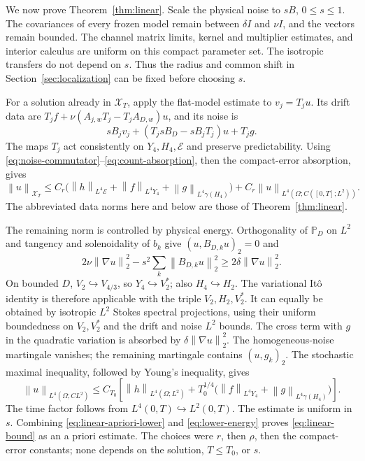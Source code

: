 \documentclass[11pt]{article}
\numberwithin{equation}{section}
\theoremstyle{remark}
\newcommand{\PP}{\mathbb P}
\newcommand{\calE}{\mathcal E}
\newcommand{\calX}{\mathcal X}
\newcommand{\norm}[1]{\left\lVert#1\right\rVert}
\begin{document}
We now prove Theorem~\ref{thm:linear}. Scale the physical noise to
$sB$, $0\leq s\leq1$. The covariances of every frozen model remain
between $\delta I$ and $\nu I$, and the vectors remain bounded.
The channel matrix limits, kernel and multiplier estimates, and
interior calculus are uniform on this compact parameter set. The
isotropic transfers do not depend on $s$. Thus the radius and common
shift in Section~\ref{sec:localization} can be fixed before choosing $s$.

For a solution already in $\calX_T$, apply the flat-model estimate to
$v_j=T_ju$. Its drift data are
$T_jf+\nu(A_{j,w}T_j-T_jA_{D,w})u$, and its noise is
\[
 sB_jv_j+(T_jsB_D-sB_jT_j)u+T_jg.
\]
The maps $T_j$ act consistently on $Y_4,H_4,\calE$ and preserve
predictability. Using \eqref{eq:noise-commutator}--\eqref{eq:count-absorption},
then the compact-error absorption, gives
\begin{equation}\label{eq:linear-apriori-lower}
 \norm{u}_{\calX_T}\leq C_r\bigl(\norm{h}_{L^4\calE}
 +\norm{f}_{L^4Y_4}+\norm{g}_{L^4\gamma(H_4)}\bigr)
 +C_r\norm{u}_{L^4(\Omega;C([0,T];L^2))}.
\end{equation}
The abbreviated data norms here and below are those of
Theorem~\ref{thm:linear}.

The remaining norm is controlled by physical energy. Orthogonality
of $\PP_D$ on $L^2$ and tangency and solenoidality of $b_k$ give
$(u,B_{D,k}u)_2=0$ and
\begin{equation}\label{eq:energy-coercivity}
 2\nu\norm{\nabla u}_2^2-s^2\sum_k\norm{B_{D,k}u}_2^2
 \geq2\delta\norm{\nabla u}_2^2.
\end{equation}
On bounded $D$, $V_2\hookrightarrow V_{4/3}$, so $Y_4\hookrightarrow V_2^*$;
also $H_4\hookrightarrow H_2$. The variational It\^o identity is
therefore applicable with the triple $V_2,H_2,V_2^*$. It can equally
be obtained by isotropic $L^2$ Stokes spectral projections, using
their uniform boundedness on $V_2,V_2^*$ and the drift and noise
$L^2$ bounds. The cross term with $g$ in the quadratic variation is
absorbed by $\delta\norm{\nabla u}_2^2$. The homogeneous-noise
martingale vanishes; the remaining martingale contains $(u,g_k)_2$.
The stochastic maximal inequality, followed by Young's inequality,
gives
\begin{equation}\label{eq:lower-energy}
 \norm{u}_{L^4(\Omega;CL^2)}\leq C_{T_0}
 \left[\norm{h}_{L^4(\Omega;L^2)}
 +T_0^{1/4}\bigl(\norm{f}_{L^4Y_4}+\norm{g}_{L^4\gamma(H_4)}\bigr)\right].
\end{equation}
The time factor follows from $L^4(0,T)\hookrightarrow L^2(0,T)$.
The estimate is uniform in $s$. Combining
\eqref{eq:linear-apriori-lower} and \eqref{eq:lower-energy} proves
\eqref{eq:linear-bound} as an a priori estimate. The choices were
$r$, then $\rho$, then the compact-error constants; none depends
on the solution, $T\leq T_0$, or $s$.
\end{document}
